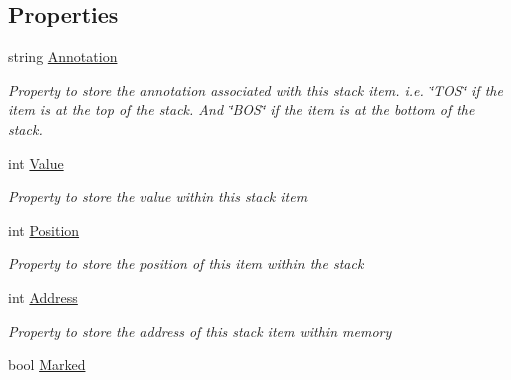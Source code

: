 \subsection*{Properties}
\begin{DoxyCompactItemize}
\item 
string \hyperlink{class_c_p_u___o_s___simulator_1_1_c_p_u_1_1_stack_item_a13f182fa7a19bcb7d78aadbd4cc04c98}{Annotation}
\begin{DoxyCompactList}\small\item\em Property to store the annotation associated with this stack item. i.\+e. \char`\"{}\+T\+O\+S\char`\"{} if the item is at the top of the stack. And \char`\"{}\+B\+O\+S\char`\"{} if the item is at the bottom of the stack. \end{DoxyCompactList}\item 
int \hyperlink{class_c_p_u___o_s___simulator_1_1_c_p_u_1_1_stack_item_ac8e518e9111640d56d59efbff2fa3161}{Value}
\begin{DoxyCompactList}\small\item\em Property to store the value within this stack item \end{DoxyCompactList}\item 
int \hyperlink{class_c_p_u___o_s___simulator_1_1_c_p_u_1_1_stack_item_aa2e46f703d2a81a32d38f12df3718909}{Position}
\begin{DoxyCompactList}\small\item\em Property to store the position of this item within the stack \end{DoxyCompactList}\item 
int \hyperlink{class_c_p_u___o_s___simulator_1_1_c_p_u_1_1_stack_item_a44f4c5bd346e25e81c54b01012768bc5}{Address}
\begin{DoxyCompactList}\small\item\em Property to store the address of this stack item within memory \end{DoxyCompactList}\item 
bool \hyperlink{class_c_p_u___o_s___simulator_1_1_c_p_u_1_1_stack_item_a90b379e1fcadd02d4ca5a473f197dd7b}{Marked}
\end{DoxyCompactItemize}
